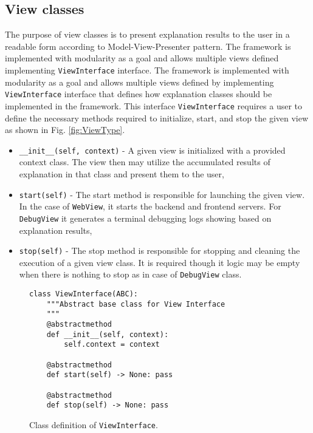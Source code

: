 \documentclass[
    bindingoffset=5mm,  %
    footnoteindent=3mm, %
    hyphenation=true    %
]{src/wut-thesis}
\begin{document}
\subsection{View classes}

The purpose of view classes is to present explanation results to the user in a readable form
according to Model-View-Presenter pattern. The framework is implemented with modularity as a goal
and allows multiple views defined implementing \texttt{ViewInterface} interface.
The framework is implemented with modularity as a goal and allows multiple views
defined by implementing \texttt{ViewInterface} interface that defines how explanation
classes should be implemented in the framework.
This interface \texttt{ViewInterface} requires a user to define the necessary
methods required to initialize, start, and stop the given view as shown in Fig. \ref{fig:ViewType}.

\begin{itemize}
    \item \texttt{__init__(self, context)} - A given view is initialized with a provided context class.
    The view then may utilize the accumulated results of explanation in that class and present them to the user,

    \item \texttt{start(self)} - The start method is responsible for launching the given view. In the case of \texttt{WebView},
    it starts the backend and frontend servers. For \texttt{DebugView} it generates a terminal debugging logs showing based on 
    explanation results,
    
    \item \texttt{stop(self)} - The stop method is responsible for stopping and cleaning the execution of a given view class. It is required though it logic may be empty when there is nothing to stop as in case of \texttt{DebugView} class.
\end{itemize}

\begin{figure}%
\begin{verbatim}
class ViewInterface(ABC):
    """Abstract base class for View Interface
    """
    @abstractmethod
    def __init__(self, context):
        self.context = context

    @abstractmethod
    def start(self) -> None: pass

    @abstractmethod
    def stop(self) -> None: pass    
\end{verbatim}
\caption{Class definition of \texttt{ViewInterface}.}
\label{fig:ViewInterface}
\end{figure}
\end{document}
